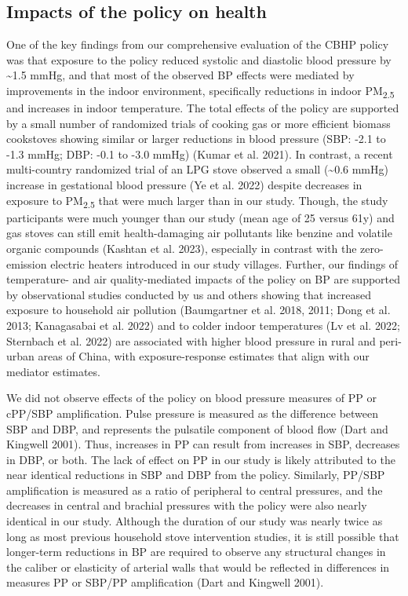 \documentclass[
  letterpaper,
  DIV=11,
  numbers=noendperiod]{scrartcl}
\begin{document}
\hypertarget{impacts-of-the-policy-on-health}{%
\subsection{Impacts of the policy on
health}\label{impacts-of-the-policy-on-health}}

One of the key findings from our comprehensive evaluation of the CBHP
policy was that exposure to the policy reduced systolic and diastolic
blood pressure by \textasciitilde1.5 mmHg, and that most of the observed
BP effects were mediated by improvements in the indoor environment,
specifically reductions in indoor PM\textsubscript{2.5} and increases in
indoor temperature. The total effects of the policy are supported by a
small number of randomized trials of cooking gas or more efficient
biomass cookstoves showing similar or larger reductions in blood
pressure (SBP: -2.1 to -1.3 mmHg; DBP: -0.1 to -3.0 mmHg) (Kumar et al.
2021). In contrast, a recent multi-country randomized trial of an LPG
stove observed a small (\textasciitilde0.6 mmHg) increase in gestational
blood pressure (Ye et al. 2022) despite decreases in exposure to
PM\textsubscript{2.5} that were much larger than in our study. Though,
the study participants were much younger than our study (mean age of 25
versus 61y) and gas stoves can still emit health-damaging air pollutants
like benzine and volatile organic compounds (Kashtan et al. 2023),
especially in contrast with the zero-emission electric heaters
introduced in our study villages. Further, our findings of temperature-
and air quality-mediated impacts of the policy on BP are supported by
observational studies conducted by us and others showing that increased
exposure to household air pollution (Baumgartner et al. 2018, 2011; Dong
et al. 2013; Kanagasabai et al. 2022) and to colder indoor temperatures
(Lv et al. 2022; Sternbach et al. 2022) are associated with higher blood
pressure in rural and peri-urban areas of China, with exposure-response
estimates that align with our mediator estimates.

We did not observe effects of the policy on blood pressure measures of
PP or cPP/SBP amplification. Pulse pressure is measured as the
difference between SBP and DBP, and represents the pulsatile component
of blood flow (Dart and Kingwell 2001). Thus, increases in PP can result
from increases in SBP, decreases in DBP, or both. The lack of effect on
PP in our study is likely attributed to the near identical reductions in
SBP and DBP from the policy. Similarly, PP/SBP amplification is measured
as a ratio of peripheral to central pressures, and the decreases in
central and brachial pressures with the policy were also nearly
identical in our study. Although the duration of our study was nearly
twice as long as most previous household stove intervention studies, it
is still possible that longer-term reductions in BP are required to
observe any structural changes in the caliber or elasticity of arterial
walls that would be reflected in differences in measures PP or SBP/PP
amplification (Dart and Kingwell 2001).
\end{document}
